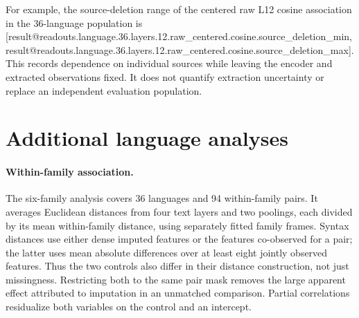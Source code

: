 \documentclass[mlmain]{jmlr}
\makeatletter
\newcommand{\Result}[1]{\csname result@#1\endcsname}
\makeatother
\begin{document}
\begin{table}[h]
\centering\footnotesize
\caption{Adjusted language correlation on the same 36-language population. ``Centered'' means
subtracting the evaluation-centroid mean; other variants use their default origin (zero for raw
vectors, the fitted grand mean for aligned ones).
E: Euclidean; C: cosine. The target is URIEL family distance, with imputed syntax as a descriptive
control.}
\end{table}
\begin{table}[h]
\centering\small
\caption{The corresponding 89-language evaluation. These associations describe a different
population; they should not be compared with the 36-language results as a pure alignment effect.}
\end{table}
\begin{table}[h]
\centering\small
\caption{Speech layer sweep using cosine dissimilarity. PR and mean pairwise cosine are computed
on the source centroids. Euclidean results and all source-deletion estimates for text are
included in the result record.}
\end{table}

For example, the source-deletion range of the centered raw L12 cosine association in the 36-language
population is [\Result{readouts.language.36.layers.12.raw_centered.cosine.source_deletion_min},
\Result{readouts.language.36.layers.12.raw_centered.cosine.source_deletion_max}]. This records
dependence on individual sources while leaving the encoder and extracted observations fixed.
It does not quantify extraction uncertainty or replace an independent evaluation population.

\section{Additional language analyses}
\label{app:language}

\paragraph{Within-family association.}
The six-family analysis covers 36 languages and 94 within-family pairs. It averages Euclidean
distances from four text layers and two poolings, each divided by its mean within-family distance,
using separately fitted family frames. Syntax distances use either dense imputed features or the
features co-observed for a pair; the latter uses mean absolute differences over at least eight
jointly observed features. Thus the two controls
also differ in their distance construction, not just missingness. Restricting both to the same
pair mask removes the large apparent effect attributed to imputation in an unmatched comparison.
Partial correlations residualize both variables on the control and an intercept.
\end{document}

